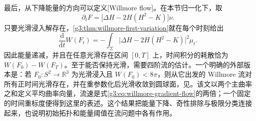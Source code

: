最后，从下降能量的方向可以定义[Willmore flow]。在本节归一化下，取
\begin{equation}\label{g3:eq:willmore-gradient-flow}
	\partial_tF=\bigl[\Delta H-2H(H^2-K)\bigr]\nu.
\end{equation}
只要光滑浸入解存在，\cref{g3:thm:willmore-first-variation}就在每个时刻给出
\begin{equation}\label{g3:eq:willmore-flow-dissipation}
	\frac{\mathrm d}{\mathrm dt}W(F_t)
	=-\int_\Sigma\bigl|\Delta H-2H(H^2-K)\bigr|^2\mu_t.
\end{equation}
因此能量递减，并且在任意光滑存在区间 \([0,T]\) 上，时间积分的耗散恰为 \(W(F_0)-W(F_T)\)。至于能否保持光滑，需要四阶流的估计。一个明确的外部版本是：若 \(F_0:S^2\to\mathbb R^3\) 为光滑浸入且 \(W(F_0)<8\pi\)，则从它出发的 Willmore 流对所有正时间光滑存在，并在重参数化后光滑收敛到圆球面，见\cite[定理5.2及其证明，第347--350页]{KuwertSchaetzle2004WillmoreSingularities}。该文以两个主曲率之和定义平均曲率向量，流速是式\eqref{g3:eq:willmore-gradient-flow}的两倍；一个固定的时间重标度便得到这里的表述。这个结果把能量下降、奇性排除与极限分类连接起来，也说明初始拓扑和能量阈值在流问题中各有作用。
